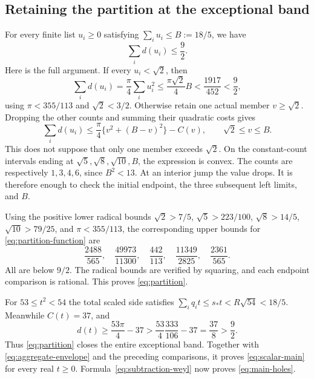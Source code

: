 \documentclass[11pt,reqno]{amsart}
\numberwithin{equation}{section}
\newcommand{\sstar}{s_*}
\begin{document}
\subsection*{Retaining the partition at the exceptional band}

For every finite list $u_i\ge0$ satisfying
$\sum_i u_i\le B:=18/5$, we have
\begin{equation}\label{eq:partition}
 \sum_i d(u_i)\le\frac92.
\end{equation}
Here is the full argument. If every $u_i<\sqrt2$, then
\[
 \sum_i d(u_i)=\frac\pi4\sum_i u_i^2
 \le\frac{\pi\sqrt2}{4}B
 <\frac{1917}{452}<\frac92,
\]
using $\pi<355/113$ and $\sqrt2<3/2$. Otherwise retain one
actual member $v\ge\sqrt2$. Dropping the other counts and
summing their quadratic costs gives
\begin{equation}\label{eq:partition-function}
 \sum_i d(u_i)\le
 \frac\pi4\{v^2+(B-v)^2\}-C(v),\qquad\sqrt2\le v\le B.
\end{equation}
This does not suppose that only one member exceeds $\sqrt2$.
On the constant-count intervals ending at
$\sqrt5,\sqrt8,\sqrt{10},B$, the expression is convex.
The counts are respectively $1,3,4,6$, since $B^2<13$.
At an interior jump the value drops. It is therefore enough
to check the initial endpoint, the three subsequent left
limits, and $B$.

Using the positive lower radical bounds
$\sqrt2>7/5$, $\sqrt5>223/100$, $\sqrt8>14/5$,
$\sqrt{10}>79/25$, and $\pi<355/113$, the corresponding
upper bounds for \eqref{eq:partition-function} are
\begin{equation}\label{eq:partition-endpoints}
 \frac{2488}{565},\quad\frac{49973}{11300},\quad
 \frac{442}{113},\quad\frac{11349}{2825},\quad
 \frac{2361}{565}.
\end{equation}
All are below $9/2$. The radical bounds are verified by
squaring, and each endpoint comparison is rational. This
proves \eqref{eq:partition}.

For $53\le t^2<54$ the total scaled side satisfies
$\sum_i q_it\le\sstar t<R\sqrt{54}<18/5$.
Meanwhile $C(t)=37$, and
\begin{equation}\label{eq:53-close}
 d(t)\ge\frac{53\pi}{4}-37
 >\frac{53}{4}\frac{333}{106}-37
 =\frac{37}{8}>\frac92.
\end{equation}
Thus \eqref{eq:partition} closes the entire exceptional band.
Together with \eqref{eq:aggregate-envelope} and the preceding
comparisons, it proves \eqref{eq:scalar-main} for every real
$t\ge0$. Formula~\eqref{eq:subtraction-weyl} now proves
\eqref{eq:main-holes}.
\end{document}
